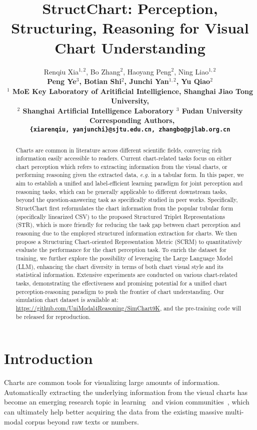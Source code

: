 \documentclass{article} \usepackage{iclr2024_conference,times}
\title{StructChart\raisebox{-0.6em}{\texttt{[image: images/SC.png]}}: Perception, Structuring, Reasoning for Visual Chart Understanding}
\author{Renqiu Xia$^{1,2}$, Bo Zhang$^{2}$\textsuperscript{\Letter}, Haoyang Peng$^{2}$, Ning Liao$^{1,2}$ \\ 
\bf{Peng Ye}$^{3}$, Botian Shi$^2$, Junchi Yan$^{1,2}$\textsuperscript{\Letter}, Yu Qiao$^2$ \\[2mm]
$^1$ MoE Key Laboratory of Aritificial Intelligience, Shanghai Jiao Tong University, \\ $^2$ Shanghai Artificial Intelligence Laboratory \quad  $^3$ Fudan University \\
{\normalsize \Letter \ Corresponding Authors}, \\
\texttt{\small {\{xiarenqiu, yanjunchi\}@sjtu.edu.cn, zhangbo@pjlab.org.cn}}
}
\begin{document}
\maketitle
\thispagestyle{fancy}
\fancyhead{}
\renewcommand{\headrulewidth}{0.7pt}

\begin{abstract}
Charts are common in literature across different scientific fields, conveying rich information easily accessible to readers. Current chart-related tasks focus on either chart perception which refers to extracting information from the visual charts, or performing reasoning given the extracted data, \textit{e.g.} in a tabular form. In this paper, we aim to establish a unified and label-efficient learning paradigm for joint perception and reasoning tasks, which can be generally applicable to different downstream tasks, beyond the question-answering task as specifically studied in peer works. Specifically, StructChart first reformulates the chart information from the popular tubular form (specifically linearized CSV) to the proposed Structured Triplet Representations (STR), which is more friendly for reducing the task gap between chart perception and reasoning due to the employed structured information extraction for charts. We then propose a Structuring Chart-oriented Representation Metric (SCRM) to quantitatively evaluate the performance for the chart perception task. To enrich the dataset for training, we further explore the possibility of leveraging the Large Language Model (LLM), enhancing the chart diversity in terms of both chart visual style and its statistical information. Extensive experiments are conducted on various chart-related tasks, demonstrating the effectiveness and promising potential for a unified chart perception-reasoning paradigm to push the frontier of chart understanding. Our simulation chart dataset is available at: \textcolor{teal}{\url{https://github.com/UniModal4Reasoning/SimChart9K}}, and the pre-training code will be released for reproduction.
\end{abstract}

\vspace{-8pt}
\section{Introduction}
\label{sec_introd}
\vspace{-8pt}

Charts are common tools for visualizing large amounts of information. Automatically extracting the underlying information from the visual charts has become an emerging research topic in learning~\citep{Masry2022ChartQAAB, nam2023stunt} and vision communities~\citep{Luo2021ChartOCRDE, Obeid2020CharttoTextGN, Rane2021ChartReaderAP}, which can ultimately help better acquiring the data from the existing massive multi-modal corpus beyond raw texts or numbers. 
\end{document}
